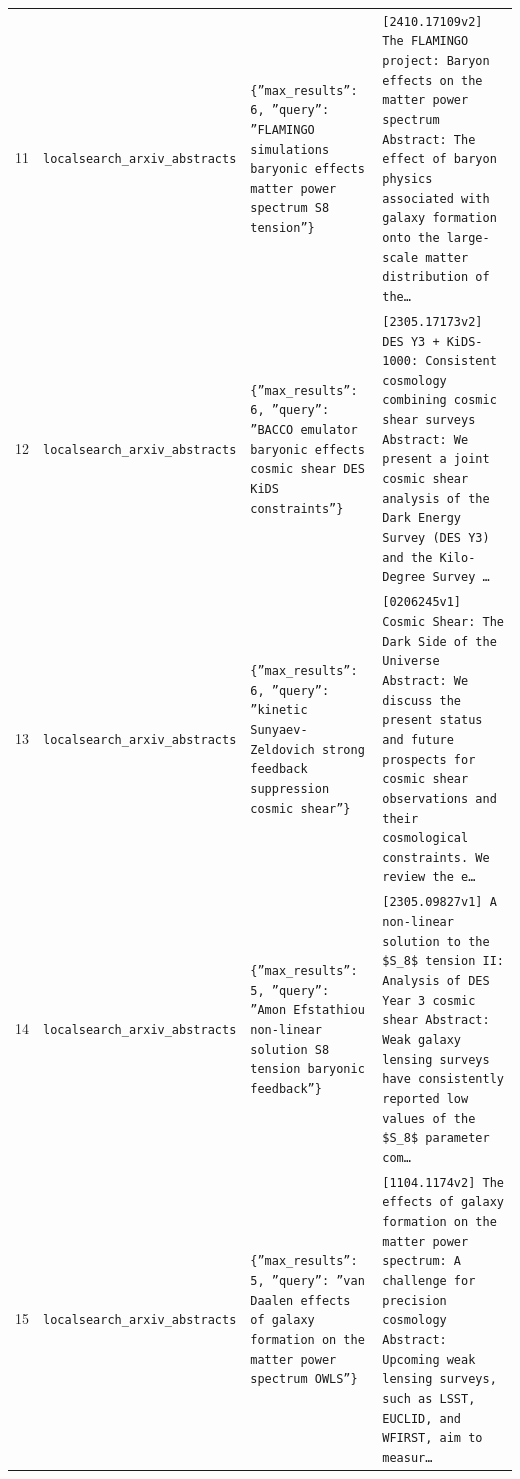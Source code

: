 \documentclass[11pt,a4paper]{article}
\begin{document}
\begin{longtable}{@{}p{}p{}p{}p{}@{}}
11 & \texttt{local}\newline\texttt{search\_\allowbreak{}arxiv\_\allowbreak{}abstracts} & \texttt{\{''max\_\allowbreak{}results'':\allowbreak{} 6,\allowbreak{} ''query'':\allowbreak{} ''FLAMINGO simulations baryonic effects matter power spectrum S8 tension''\}\allowbreak{}} & \texttt{[2410.17109v2]\allowbreak{} The FLAMINGO project:\allowbreak{} Baryon effects on the matter power spectrum Abstract:\allowbreak{} The effect of baryon physics associated with galaxy formation onto the large-scale matter distribution of the\ldots{}\allowbreak{}} \\
12 & \texttt{local}\newline\texttt{search\_\allowbreak{}arxiv\_\allowbreak{}abstracts} & \texttt{\{''max\_\allowbreak{}results'':\allowbreak{} 6,\allowbreak{} ''query'':\allowbreak{} ''BACCO emulator baryonic effects cosmic shear DES KiDS constraints''\}\allowbreak{}} & \texttt{[2305.17173v2]\allowbreak{} DES Y3 + KiDS-1000:\allowbreak{} Consistent cosmology combining cosmic shear surveys Abstract:\allowbreak{} We present a joint cosmic shear analysis of the Dark Energy Survey (DES Y3)\allowbreak{} and the Kilo-Degree Survey \ldots{}\allowbreak{}} \\
13 & \texttt{local}\newline\texttt{search\_\allowbreak{}arxiv\_\allowbreak{}abstracts} & \texttt{\{''max\_\allowbreak{}results'':\allowbreak{} 6,\allowbreak{} ''query'':\allowbreak{} ''kinetic Sunyaev-Zeldovich strong feedback suppression cosmic shear''\}\allowbreak{}} & \texttt{[0206245v1]\allowbreak{} Cosmic Shear:\allowbreak{} The Dark Side of the Universe Abstract:\allowbreak{}   We discuss the present status and future prospects for cosmic shear observations and their cosmological constraints. We review the e\ldots{}\allowbreak{}} \\
14 & \texttt{local}\newline\texttt{search\_\allowbreak{}arxiv\_\allowbreak{}abstracts} & \texttt{\{''max\_\allowbreak{}results'':\allowbreak{} 5,\allowbreak{} ''query'':\allowbreak{} ''Amon Efstathiou non-linear solution S8 tension baryonic feedback''\}\allowbreak{}} & \texttt{[2305.09827v1]\allowbreak{} A non-linear solution to the \$S\_\allowbreak{}8\$ tension II:\allowbreak{} Analysis of DES Year 3 cosmic shear Abstract:\allowbreak{} Weak galaxy lensing surveys have consistently reported low values of the \$S\_\allowbreak{}8\$ parameter com\ldots{}\allowbreak{}} \\
15 & \texttt{local}\newline\texttt{search\_\allowbreak{}arxiv\_\allowbreak{}abstracts} & \texttt{\{''max\_\allowbreak{}results'':\allowbreak{} 5,\allowbreak{} ''query'':\allowbreak{} ''van Daalen effects of galaxy formation on the matter power spectrum OWLS''\}\allowbreak{}} & \texttt{[1104.1174v2]\allowbreak{} The effects of galaxy formation on the matter power spectrum:\allowbreak{} A challenge for precision cosmology Abstract:\allowbreak{} Upcoming weak lensing surveys,\allowbreak{} such as LSST,\allowbreak{} EUCLID,\allowbreak{} and WFIRST,\allowbreak{} aim to measur\ldots{}\allowbreak{}} \\

\end{longtable}
\end{document}
